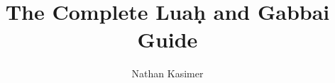 \documentclass[11pt, openany]{book}
\begin{document}
	
	\title{The Complete Lua\d{h} and Gabbai Guide}
	
	\author{Nathan Kasimer}
	
	\maketitle
	
	\tableofcontents

			
	
	
	
	
	
	
	
	
\end{document}
